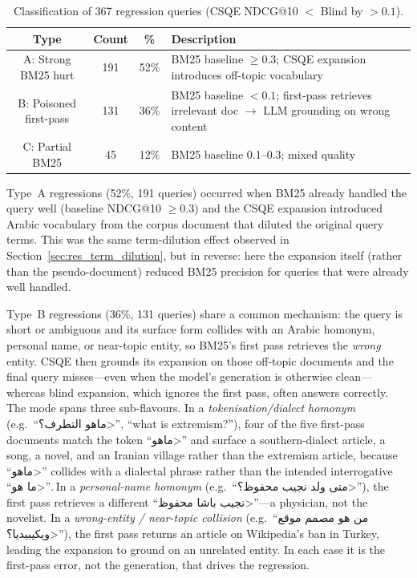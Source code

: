 \begin{table}[htbp]
    \centering
    \caption[Classification of regression queries]{Classification of 367 regression queries (CSQE NDCG@10 $<$ Blind by $> 0.1$).}
    \label{tab:regression_causes}
    \begin{tabular}{@{}cccp{7cm}@{}}
        \toprule
        \textbf{Type} & \textbf{Count} & \textbf{\%} & \textbf{Description} \\
        \midrule
        A: Strong BM25 hurt & 191 & 52\% & BM25 baseline $\geq 0.3$; CSQE expansion introduces off-topic vocabulary \\
        B: Poisoned first-pass & 131 & 36\% & BM25 baseline $< 0.1$; first-pass retrieves irrelevant doc $\rightarrow$ LLM grounding on wrong content \\
        C: Partial BM25 & 45 & 12\% & BM25 baseline 0.1--0.3; mixed quality \\
        \bottomrule
    \end{tabular}
\end{table}

Type~A regressions (52\%, 191 queries) occurred when BM25 already handled the query well (baseline NDCG@10 $\geq 0.3$) and the CSQE expansion introduced Arabic vocabulary from the corpus document that diluted the original query terms. This was the same term-dilution effect observed in Section~\ref{sec:res_term_dilution}, but in reverse: here the expansion itself (rather than the pseudo-document) reduced BM25 precision for queries that were already well handled.

Type~B regressions (36\%, 131 queries) share a common mechanism: the query is short or ambiguous and its surface form collides with an Arabic homonym, personal name, or near-topic entity, so BM25's first pass retrieves the \emph{wrong} entity. CSQE then grounds its expansion on those off-topic documents and the final query misses---even when the model's generation is otherwise clean---whereas blind expansion, which ignores the first pass, often answers correctly. The mode spans three sub-flavours. In a \emph{tokenisation/dialect homonym} (e.g.\ ``\<ماهو التطرف؟>'', ``what is extremism?''), four of the five first-pass documents match the token ``\<ماهو>'' and surface a southern-dialect article, a song, a novel, and an Iranian village rather than the extremism article, because ``\<ماهو>'' collides with a dialectal phrase rather than the intended interrogative ``\<ما هو>''. In a \emph{personal-name homonym} (e.g.\ ``\<متى ولد نجيب محفوظ؟>''), the first pass retrieves a different ``\<نجيب باشا محفوظ>''---a physician, not the novelist. In a \emph{wrong-entity / near-topic collision} (e.g.\ ``\<من هو مصمم موقع ويكيبيديا؟>''), the first pass returns an article on Wikipedia's ban in Turkey, leading the expansion to ground on an unrelated entity. In each case it is the first-pass error, not the generation, that drives the regression.

